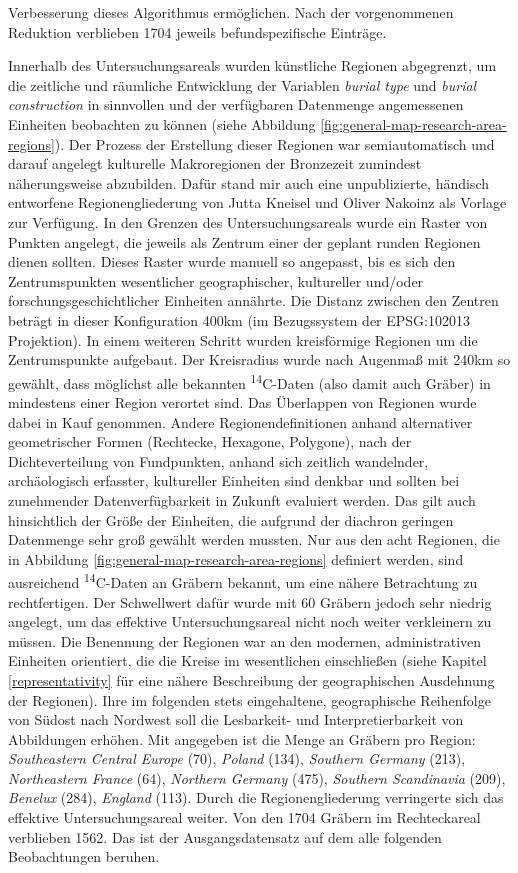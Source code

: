 \documentclass[openany,twoside,twocolumn]{book}
\begin{document}
Verbesserung dieses Algorithmus ermöglichen. Nach der vorgenommenen Reduktion verblieben 1704 jeweils befundspezifische Einträge.

Innerhalb des Untersuchungsareals wurden künstliche Regionen abgegrenzt, um die zeitliche und räumliche Entwicklung der Variablen \emph{burial type} und \emph{burial construction} in sinnvollen und der verfügbaren Datenmenge angemessenen Einheiten beobachten zu können (siehe Abbildung \ref{fig:general-map-research-area-regions}). Der Prozess der Erstellung dieser Regionen war semiautomatisch und darauf angelegt kulturelle Makroregionen der Bronzezeit zumindest näherungsweise abzubilden. Dafür stand mir auch eine unpublizierte, händisch entworfene Regionengliederung von Jutta Kneisel und Oliver Nakoinz als Vorlage zur Verfügung. In den Grenzen des Untersuchungsareals wurde ein Raster von Punkten angelegt, die jeweils als Zentrum einer der geplant runden Regionen dienen sollten. Dieses Raster wurde manuell so angepasst, bis es sich den Zentrumspunkten wesentlicher geographischer, kultureller und/oder forschungsgeschichtlicher Einheiten annährte. Die Distanz zwischen den Zentren beträgt in dieser Konfiguration 400km (im Bezugssystem der EPSG:102013 Projektion). In einem weiteren Schritt wurden kreisförmige Regionen um die Zentrumspunkte aufgebaut. Der Kreisradius wurde nach Augenmaß mit 240km so gewählt, dass möglichst alle bekannten \textsuperscript{14}C-Daten (also damit auch Gräber) in mindestens einer Region verortet sind. Das Überlappen von Regionen wurde dabei in Kauf genommen. Andere Regionendefinitionen anhand alternativer geometrischer Formen (Rechtecke, Hexagone, Polygone), nach der Dichteverteilung von Fundpunkten, anhand sich zeitlich wandelnder, archäologisch erfasster, kultureller Einheiten sind denkbar und sollten bei zunehmender Datenverfügbarkeit in Zukunft evaluiert werden. Das gilt auch hinsichtlich der Größe der Einheiten, die aufgrund der diachron geringen Datenmenge sehr groß gewählt werden mussten. Nur aus den acht Regionen, die in Abbildung \ref{fig:general-map-research-area-regions} definiert werden, sind ausreichend \textsuperscript{14}C-Daten an Gräbern bekannt, um eine nähere Betrachtung zu rechtfertigen. Der Schwellwert dafür wurde mit 60 Gräbern jedoch sehr niedrig angelegt, um das effektive Untersuchungsareal nicht noch weiter verkleinern zu müssen. Die Benennung der Regionen war an den modernen, administrativen Einheiten orientiert, die die Kreise im wesentlichen einschließen (siehe Kapitel \ref{representativity} für eine nähere Beschreibung der geographischen Ausdehnung der Regionen). Ihre im folgenden stets eingehaltene, geographische Reihenfolge von Südost nach Nordwest soll die Lesbarkeit- und Interpretierbarkeit von Abbildungen erhöhen. Mit angegeben ist die Menge an Gräbern pro Region: \emph{Southeastern Central Europe} (70), \emph{Poland} (134), \emph{Southern Germany} (213), \emph{Northeastern France} (64), \emph{Northern Germany} (475), \emph{Southern Scandinavia} (209), \emph{Benelux} (284), \emph{England} (113). Durch die Regionengliederung verringerte sich das effektive Untersuchungsareal weiter. Von den 1704 Gräbern im Rechteckareal verblieben 1562. Das ist der Ausgangsdatensatz auf dem alle folgenden Beobachtungen beruhen.
\end{document}
